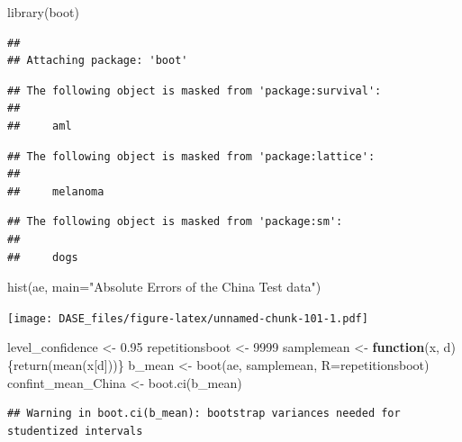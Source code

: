 \documentclass[
]{book}
\newenvironment{Shaded}{\begin{snugshade}}{\end{snugshade}}
\newcommand{\AttributeTok}[1]{\textcolor[rgb]{0.77,0.63,0.00}{#1}}
\newcommand{\ControlFlowTok}[1]{\textcolor[rgb]{0.13,0.29,0.53}{\textbf{#1}}}
\newcommand{\DecValTok}[1]{\textcolor[rgb]{0.00,0.00,0.81}{#1}}
\newcommand{\FloatTok}[1]{\textcolor[rgb]{0.00,0.00,0.81}{#1}}
\newcommand{\FunctionTok}[1]{\textcolor[rgb]{0.00,0.00,0.00}{#1}}
\newcommand{\NormalTok}[1]{#1}
\newcommand{\OtherTok}[1]{\textcolor[rgb]{0.56,0.35,0.01}{#1}}
\newcommand{\StringTok}[1]{\textcolor[rgb]{0.31,0.60,0.02}{#1}}
\begin{document}
\begin{Shaded}
\begin{Highlighting}[]
\FunctionTok{library}\NormalTok{(boot)}
\end{Highlighting}
\end{Shaded}

\begin{verbatim}
## 
## Attaching package: 'boot'
\end{verbatim}

\begin{verbatim}
## The following object is masked from 'package:survival':
## 
##     aml
\end{verbatim}

\begin{verbatim}
## The following object is masked from 'package:lattice':
## 
##     melanoma
\end{verbatim}

\begin{verbatim}
## The following object is masked from 'package:sm':
## 
##     dogs
\end{verbatim}

\begin{Shaded}
\begin{Highlighting}[]
\FunctionTok{hist}\NormalTok{(ae, }\AttributeTok{main=}\StringTok{"Absolute Errors of the China Test data"}\NormalTok{)}
\end{Highlighting}
\end{Shaded}

\texttt{[image: DASE\_files/figure-latex/unnamed-chunk-101-1.pdf]}

\begin{Shaded}
\begin{Highlighting}[]
\NormalTok{level\_confidence }\OtherTok{\textless{}{-}} \FloatTok{0.95}
\NormalTok{repetitionsboot }\OtherTok{\textless{}{-}} \DecValTok{9999}
\NormalTok{samplemean }\OtherTok{\textless{}{-}} \ControlFlowTok{function}\NormalTok{(x, d)\{}\FunctionTok{return}\NormalTok{(}\FunctionTok{mean}\NormalTok{(x[d]))\}}
\NormalTok{b\_mean }\OtherTok{\textless{}{-}} \FunctionTok{boot}\NormalTok{(ae, samplemean, }\AttributeTok{R=}\NormalTok{repetitionsboot)}
\NormalTok{confint\_mean\_China }\OtherTok{\textless{}{-}} \FunctionTok{boot.ci}\NormalTok{(b\_mean)}
\end{Highlighting}
\end{Shaded}

\begin{verbatim}
## Warning in boot.ci(b_mean): bootstrap variances needed for studentized intervals
\end{verbatim}
\end{document}
